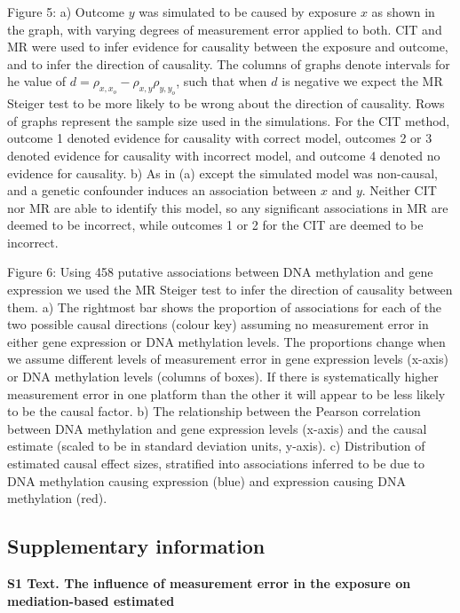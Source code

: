 \documentclass[]{article}
\begin{document}
Figure 5: a) Outcome \(y\) was simulated to be caused by exposure \(x\)
as shown in the graph, with varying degrees of measurement error applied
to both. CIT and MR were used to infer evidence for causality between
the exposure and outcome, and to infer the direction of causality. The
columns of graphs denote intervals for he value of
\(d = \rho_{x, x_o} - \rho_{x,y}\rho_{y,y_o}\), such that when \(d\) is
negative we expect the MR Steiger test to be more likely to be wrong
about the direction of causality. Rows of graphs represent the sample
size used in the simulations. For the CIT method, outcome 1 denoted
evidence for causality with correct model, outcomes 2 or 3 denoted
evidence for causality with incorrect model, and outcome 4 denoted no
evidence for causality. b) As in (a) except the simulated model was
non-causal, and a genetic confounder induces an association between
\(x\) and \(y\). Neither CIT nor MR are able to identify this model, so
any significant associations in MR are deemed to be incorrect, while
outcomes 1 or 2 for the CIT are deemed to be incorrect.

Figure 6: Using 458 putative associations between DNA methylation and
gene expression we used the MR Steiger test to infer the direction of
causality between them. a) The rightmost bar shows the proportion of
associations for each of the two possible causal directions (colour key)
assuming no measurement error in either gene expression or DNA
methylation levels. The proportions change when we assume different
levels of measurement error in gene expression levels (x-axis) or DNA
methylation levels (columns of boxes). If there is systematically higher
measurement error in one platform than the other it will appear to be
less likely to be the causal factor. b) The relationship between the
Pearson correlation between DNA methylation and gene expression levels
(x-axis) and the causal estimate (scaled to be in standard deviation
units, y-axis). c) Distribution of estimated causal effect sizes,
stratified into associations inferred to be due to DNA methylation
causing expression (blue) and expression causing DNA methylation (red).

\subsection{Supplementary information}\label{supplementary-information}

\textbf{S1 Text. The influence of measurement error in the exposure on
mediation-based estimated}
\end{document}
